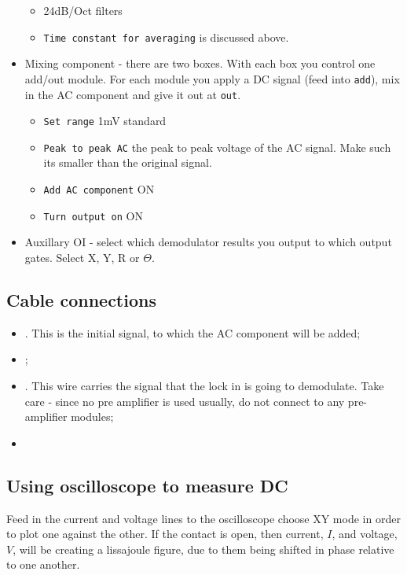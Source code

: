 \begin{itemize}
    \begin{itemize}
    	\item 24dB/Oct filters
    	\item \texttt{Time constant for averaging} is discussed above.
    \end{itemize}
    \item Mixing component - there are two boxes. With each box you control one add/out module. For each module you apply a DC signal (feed into \texttt{add}), mix in the AC component and give it out at \texttt{out}.
    \begin{itemize}
    	\item \texttt{Set range} \ra 1mV standard
    	\item \texttt{Peak to peak AC} \ra the peak to peak voltage of the AC signal. Make such its smaller than the original signal.
    	\item \texttt{Add AC component} \ra ON
    	\item \texttt{Turn output on} \ra ON
    \end{itemize}
    \item Auxillary OI - select which demodulator results you output to which output gates. Select X, Y, R or $\Theta$.
   \end{itemize}

   \subsection{Cable connections}
    \begin{itemize}
    	\item {}. This is the initial signal, to which the AC component will be added;
    	\item {};
    	\item {}. This wire carries the signal that the lock in is going to demodulate. Take care - since no pre amplifier is used usually, do not connect to any pre-amplifier modules;
    	\item {}
    \end{itemize}
 
  \subsection{Using oscilloscope to measure DC}
   Feed in the current and voltage lines to the oscilloscope \ra choose XY mode in order to plot one against the other. If the contact is open, then current, $ I $, and voltage, $ V $, will be creating a lissajoule figure, due to them being shifted in phase relative to one another.
   
  
 \newpage
 